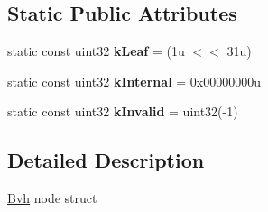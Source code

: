\subsection*{\-Static \-Public \-Attributes}
\begin{DoxyCompactItemize}
\item 
\hypertarget{structnih_1_1_bvh__node_a889438f2fc6391772fe2e8023157e34e}{
static const uint32 {\bfseries k\-Leaf} = (1u $<$$<$ 31u)}
\label{structnih_1_1_bvh__node_a889438f2fc6391772fe2e8023157e34e}

\item 
\hypertarget{structnih_1_1_bvh__node_ae8120e97f8f1a15f95af7a382d10f444}{
static const uint32 {\bfseries k\-Internal} = 0x00000000u}
\label{structnih_1_1_bvh__node_ae8120e97f8f1a15f95af7a382d10f444}

\item 
\hypertarget{structnih_1_1_bvh__node_a80a999554f86a11a84130177ab202e15}{
static const uint32 {\bfseries k\-Invalid} = uint32(-\/1)}
\label{structnih_1_1_bvh__node_a80a999554f86a11a84130177ab202e15}

\end{DoxyCompactItemize}


\subsection{\-Detailed \-Description}
\hyperlink{structnih_1_1_bvh}{\-Bvh} node struct 

